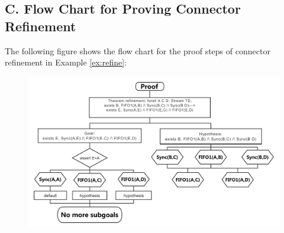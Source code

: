 \documentclass{llncs}
\begin{document}
\subsection*{C. Flow Chart for Proving Connector Refinement}
The following figure shows the flow chart for the proof steps of connector refinement in Example \ref{ex:refine}:
\begin{figure}[htbp]
\centering
\includegraphics[width=11.5cm]{Refinement.pdf}
\end{figure}



\end{document}
